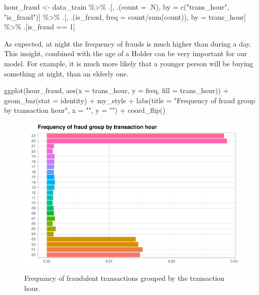 \documentclass[
]{report}
\newenvironment{Shaded}{\begin{snugshade}}{\end{snugshade}}
\newcommand{\AttributeTok}[1]{\textcolor[rgb]{0.77,0.63,0.00}{#1}}
\newcommand{\DecValTok}[1]{\textcolor[rgb]{0.00,0.00,0.81}{#1}}
\newcommand{\FunctionTok}[1]{\textcolor[rgb]{0.00,0.00,0.00}{#1}}
\newcommand{\NormalTok}[1]{#1}
\newcommand{\OtherTok}[1]{\textcolor[rgb]{0.56,0.35,0.01}{#1}}
\newcommand{\SpecialCharTok}[1]{\textcolor[rgb]{0.00,0.00,0.00}{#1}}
\newcommand{\StringTok}[1]{\textcolor[rgb]{0.31,0.60,0.02}{#1}}
\begin{document}
\begin{Shaded}
\begin{Highlighting}[]
\NormalTok{hour\_fraud }\OtherTok{\textless{}{-}}\NormalTok{ data\_train }\SpecialCharTok{\%\textgreater{}\%}
\NormalTok{  .[, .(}\AttributeTok{count =}\NormalTok{ .N), by }\OtherTok{=} \FunctionTok{c}\NormalTok{(}\StringTok{"trans\_hour"}\NormalTok{, }\StringTok{"is\_fraud"}\NormalTok{)] }\SpecialCharTok{\%\textgreater{}\%}
\NormalTok{  .[, .(is\_fraud, }\AttributeTok{freq =}\NormalTok{ count}\SpecialCharTok{/}\FunctionTok{sum}\NormalTok{(count)), by }\OtherTok{=}\NormalTok{ trans\_hour] }\SpecialCharTok{\%\textgreater{}\%}
\NormalTok{  .[is\_fraud }\SpecialCharTok{==} \DecValTok{1}\NormalTok{]}
\end{Highlighting}
\end{Shaded}

As expected, at night the frequency of frauds is much higher than during
a day. This insight, combined with the age of a Holder can be very
important for our model. For example, it is much more likely that a
younger person will be buying something at night, than an elderly one.

\begin{Shaded}
\begin{Highlighting}[]
\FunctionTok{ggplot}\NormalTok{(hour\_fraud, }\FunctionTok{aes}\NormalTok{(}\AttributeTok{x =}\NormalTok{ trans\_hour, }\AttributeTok{y =}\NormalTok{ freq, }\AttributeTok{fill =}\NormalTok{ trans\_hour)) }\SpecialCharTok{+}
  \FunctionTok{geom\_bar}\NormalTok{(}\AttributeTok{stat =} \StringTok{\textquotesingle{}identity\textquotesingle{}}\NormalTok{) }\SpecialCharTok{+}
\NormalTok{  my\_style }\SpecialCharTok{+}
  \FunctionTok{labs}\NormalTok{(}\AttributeTok{title =} \StringTok{"Frequency of fraud group by transaction hour"}\NormalTok{,}
       \AttributeTok{x =} \StringTok{""}\NormalTok{,}
       \AttributeTok{y =} \StringTok{""}\NormalTok{) }\SpecialCharTok{+}
  \FunctionTok{coord\_flip}\NormalTok{()}
\end{Highlighting}
\end{Shaded}

\begin{figure}
\centering
\includegraphics{credit_card_fraud_detection_files/figure-latex/hour_fraud_plot-1.pdf}
\caption{\label{Fig:hour_fraud_plot}Frequancy of fraudulent transactions
grouped by the transaction hour.}
\end{figure}
\end{document}
